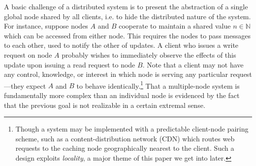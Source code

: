 A basic challenge of a distributed system is to present the abstraction of a
single global node shared by all clients, i.e. to hide the distributed nature of
the system. For instance, suppose nodes $A$ and $B$ cooperate to maintain a
shared value $n \in \mathbb{N}$ which can be accessed from either node. This
requires the nodes to pass messages to each other, used to notify the other of
updates. A client who issues a write request on node $A$ probably wishes to
immediately observe the effects of this update upon issuing a read request to
node $B$. Note that a client may not have any control, knowledge, or interest in
which node is serving any particular request---they expect $A$ and $B$ to behave
identically.\footnote{Though a system may be implemented with a predictable
client-node pairing scheme, such as a content-distribution network (CDN) which
routes web requests to the caching node geographically nearest to the client.
Such a design exploits \emph{locality}, a major theme of this paper we get into
later.} That a multiple-node system is fundamentally more complex than an
individual node is evidenced by the fact that the previous goal is not
realizable in a certain extremal sense.

